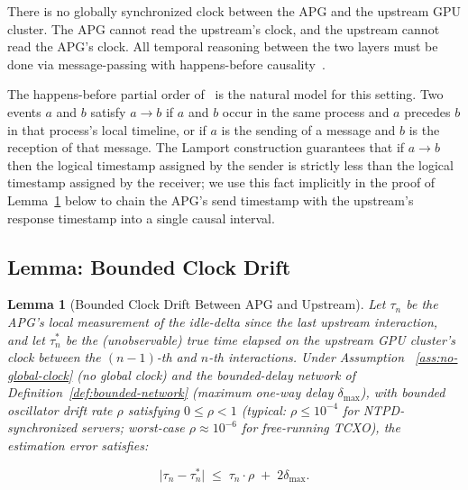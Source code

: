 \documentclass[10pt,twocolumn]{article}
\newtheorem{lemma}[theorem]{Lemma}
\theoremstyle{definition}
\theoremstyle{remark}
\begin{document}
\begin{assumption}
\label{ass:no-global-clock}
There is no globally synchronized clock between the APG and the
upstream GPU cluster. The APG cannot read the upstream's clock, and
the upstream cannot read the APG's clock. All temporal reasoning
between the two layers must be done via message-passing with
happens-before causality~\citep{lamport1978}.
\end{assumption}

The happens-before partial order of~\citet{lamport1978} is the natural
model for this setting. Two events $a$ and $b$ satisfy $a \to b$ if
$a$ and $b$ occur in the same process and $a$ precedes $b$ in that
process's local timeline, or if $a$ is the sending of a message and
$b$ is the reception of that message. The Lamport construction
guarantees that if $a \to b$ then the logical timestamp assigned by the
sender is strictly less than the logical timestamp assigned by the
receiver; we use this fact implicitly in the proof of
Lemma~\ref{lem:bounded-drift} below to chain the APG's send timestamp
with the upstream's response timestamp into a single causal interval.

\subsection{Lemma: Bounded Clock Drift}
\label{sec:clock-drift:lemma}

\begin{lemma}[Bounded Clock Drift Between APG and Upstream]
\label{lem:bounded-drift}
Let $\tau_n$ be the APG's local measurement of the idle-delta since the
last upstream interaction, and let $\tau_n^*$ be the (unobservable) true
time elapsed on the upstream GPU cluster's clock between the
$(n-1)$-th and $n$-th interactions. Under Assumption~
\ref{ass:no-global-clock} (no global clock) and the bounded-delay
network of Definition~\ref{def:bounded-network} (maximum one-way
delay $\delta_{\max}$), with bounded oscillator drift rate $\rho$
satisfying $0 \le \rho < 1$ (typical: $\rho \le 10^{-4}$ for
NTPD-synchronized servers; worst-case $\rho \approx 10^{-6}$ for
free-running TCXO), the estimation error satisfies:

\begin{equation}
\bigl| \tau_n - \tau_n^* \bigr|
\;\le\; \tau_n \cdot \rho \;+\; 2 \delta_{\max}.
\label{eq:bounded-drift}
\end{equation}
\end{lemma}
\end{document}
